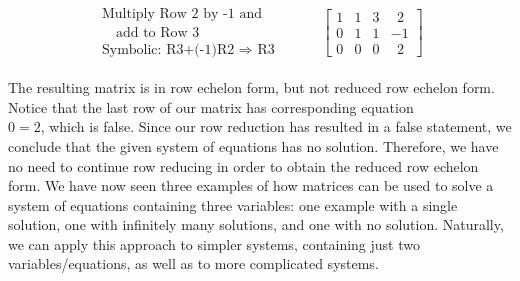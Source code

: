 \begin{eqnarray*}
\begin{array}{l}
\text{Multiply Row 2 by -1 and}\\
\text{~~~add to Row 3}\\
\text{Symbolic: R3+(-1)R2~}\Rightarrow \text{~R3}
\end{array}
&&
~~~~~~\left[
\begin{array}{ccc|c}
1 & 1 & 3 & ~~2\\
0 & 1 & 1 & -1\\
0 & 0 & 0 & ~~2
\end{array}
\right]
\end{eqnarray*}

The resulting matrix is in row echelon form, but not reduced row echelon form.  Notice that the last row of our matrix has corresponding equation\\ $0=2$, which is false.  Since our row reduction has resulted in a false statement, we conclude that the given system of equations has no solution.  Therefore, we have no need to continue row reducing in order to obtain the reduced row echelon form.\pp
We have now seen three examples of how matrices can be used to solve a system of equations containing three variables: one example with a single solution, one with infinitely many solutions, and one with no solution.  Naturally, we can apply this approach to simpler systems, containing just two variables/equations, as well as to more complicated systems.